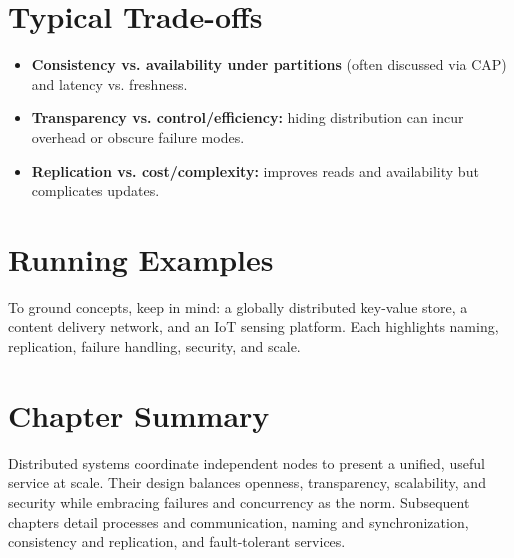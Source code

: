 \documentclass[a4paper,12pt]{book}
\begin{document}
\section{Typical Trade-offs}
\begin{itemize}
  \item \textbf{Consistency vs. availability under partitions} (often discussed via CAP) and latency vs. freshness.
  \item \textbf{Transparency vs. control/efficiency:} hiding distribution can incur overhead or obscure failure modes.
  \item \textbf{Replication vs. cost/complexity:} improves reads and availability but complicates updates.
\end{itemize}

\section{Running Examples}
To ground concepts, keep in mind: a globally distributed key-value store, a content delivery network, and an IoT sensing platform. Each highlights naming, replication, failure handling, security, and scale.

\section{Chapter Summary}
Distributed systems coordinate independent nodes to present a unified, useful service at scale. Their design balances openness, transparency, scalability, and security while embracing failures and concurrency as the norm. Subsequent chapters detail processes and communication, naming and synchronization, consistency and replication, and fault-tolerant services.
\end{document}
